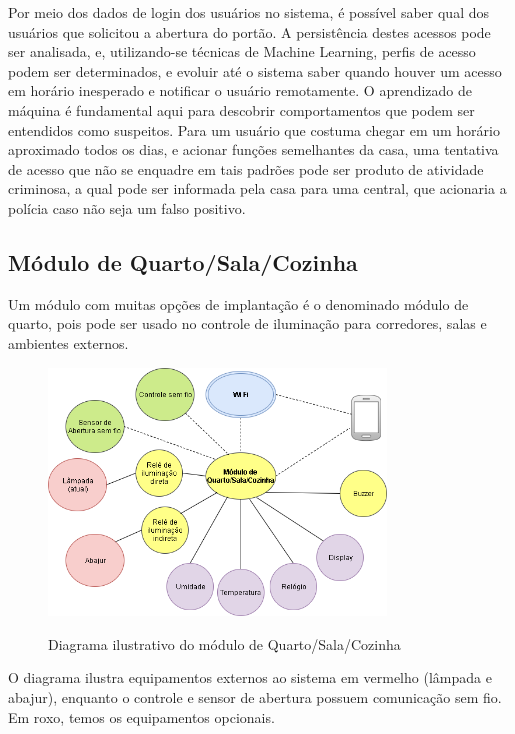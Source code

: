 Por meio dos dados de login dos usuários no sistema, é possível saber qual dos usuários que solicitou a abertura do portão. A persistência destes acessos pode ser analisada, e, utilizando-se técnicas de Machine Learning, perfis de acesso podem ser determinados, e evoluir até o sistema saber quando houver um acesso em horário inesperado e notificar o usuário remotamente. O aprendizado de máquina é fundamental aqui para descobrir comportamentos que podem ser entendidos como suspeitos. Para um usuário que costuma chegar em um horário aproximado todos os dias, e acionar funções semelhantes da casa, uma tentativa de acesso que não se enquadre em tais padrões pode ser produto de atividade criminosa, a qual pode ser informada pela casa para uma central, que acionaria a polícia caso não seja um falso positivo.

\subsection{Módulo de Quarto/Sala/Cozinha}
Um módulo com muitas opções de implantação é o denominado módulo de quarto, pois pode ser usado no controle de iluminação para corredores, salas e ambientes externos.

\begin{figure}[H]
	\centering
	\caption{Diagrama ilustrativo do módulo de Quarto/Sala/Cozinha}
	\includegraphics[width=0.8\textwidth]{diagramaModuloQuarto}
	\label{fig:diagramaModuloQuarto}
\end{figure}

O diagrama ilustra equipamentos externos ao sistema em vermelho (lâmpada e abajur), enquanto o controle e sensor de abertura possuem comunicação sem fio. Em roxo, temos os equipamentos opcionais.

